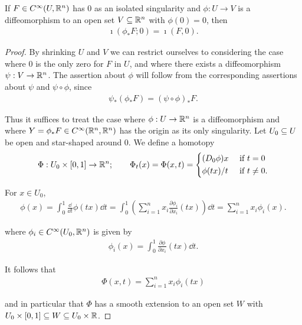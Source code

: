 \begin{lemma}\label{lemma:11-18}
  If $F\in C^\infty(U, \mathbb{R}^n)$ has 0 as an isolated singularity and $\phi:U\to V$
  is a diffeomorphism to an open set $V\subseteq \mathbb{R}^n$ with $\phi(0) = 0$, then 
  \begin{align*}
    \imath(\phi_*F; 0) = \imath(F, 0).
  \end{align*}
\end{lemma}

\begin{proof}
  By shrinking $U$ and $V$ we can restrict ourselves to considering the case
where 0 is the only zero for $F$ in $U$, and where there exists a diffeomorphism
$\psi:V\to\mathbb{R}^n$. The assertion about $\phi$ will follow from the corresponding assertions
about $\psi$ and $\psi\circ\phi$, since
\begin{align*}
  \psi_*(\phi_*F) = (\psi\circ\phi)_*F.
\end{align*}

Thus it suffices to treat the case where $\phi:U\to \mathbb{R}^n$ is a diffeomorphism and where
$Y=\phi_* F\in C^\infty(\mathbb{R}^n, \mathbb{R}^n)$ has the origin as its only singularity.
Let $U_0\subseteq U$ be open and star-shaped around 0. We define a homotopy
\begin{align*}
  \Phi:U_0\times [0, 1]\to \mathbb{R}^n; \qquad \Phi_t(x) 
    = \Phi(x, t) = \left\{\begin{aligned}
      & (D_0\phi)x && \text{ if } t = 0 \\
      & \phi(tx)/t && \text{ if } t\neq 0.
    \end{aligned}\right.
\end{align*}

For $x\in U_0$, 
\begin{align*}
  \phi(x) = \int_0^1 \frac{\dd }{\dd t}\phi(tx)\dd t 
    = \int_0^1 \left( \sum_{i=1}^{n }{x_i\frac{\partial \phi_i }{\partial x_i }(tx)} \right)\dd t
    = \sum_{i=1 }^{n }{x_i\phi_i(x)}.
\end{align*}

where $\phi_i\in C^\infty(U_0, \mathbb{R}^n)$ is given by 
\begin{align*}
  \phi_i(x) = \int_0^1 \frac{\partial \phi }{\partial x_i }(tx)\dd t.
\end{align*}

It follows that
\begin{align*}
  \Phi(x, t) = \sum_{i=1 }^{n }{x_i\phi_i (tx)}
\end{align*}

and in particular that $\Phi$ has a smooth extension to an open set $W$ with
$U_0\times[0,1]\subseteq W\subseteq U_0\times\mathbb{R}$. 


\end{proof}
